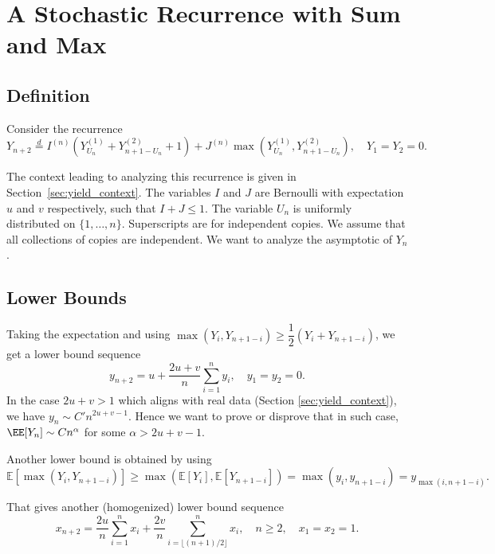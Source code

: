 \chapter{A Stochastic Recurrence with Sum and Max}

\section{Definition}

Consider the recurrence
\begin{equation}
  \label{eq:yield_indicator}
  Y_{n+2} \stackrel{d}{=} I^{(n)}\left(Y_{U_n}^{(1)} + Y_{n+1-U_n}^{(2)} + 1\right) + J^{(n)}\max\left(Y_{U_n}^{(1)}, Y_{n+1-U_n}^{(2)}\right), \quad Y_1 = Y_2 = 0.
\end{equation}

The context leading to analyzing this recurrence is given in Section~\ref{sec:yield_context}. The variables $I$ and $J$ are Bernoulli with expectation $u$ and $v$ respectively, such that $I + J \le 1$. The variable $U_n$ is uniformly distributed on $\{1, \ldots, n\}$. Superscripts are for independent copies. We assume that all collections of copies are independent. We want to analyze the asymptotic of $Y_n$.

\section{Lower Bounds}
Taking the expectation and using $\max(Y_i, Y_{n+1-i}) \ge \dfrac{1}{2}(Y_i + Y_{n+1-i})$, we get a lower bound sequence
\begin{equation}
  \label{eq:lower_bound_average}
  y_{n+2} = u + \dfrac{2u+v}{n}\sum_{i=1}^{n}y_i, \quad y_1=y_2=0.
\end{equation}
In the case $2u+v > 1$ which aligns with real data (Section \ref{sec:yield_context}), we have $y_n \sim C'n^{2u+v-1}$. Hence we want to prove or disprove that in such case, $\EE[Y_n]\sim Cn^\alpha$ for some $\alpha > 2u+v-1$.

Another lower bound is obtained by using
$$\mathbb{E}[\max(Y_i, Y_{n+1-i})] \ge \max(\mathbb{E}[Y_i], \mathbb{E}[Y_{n+1-i}]) = \max(y_i, y_{n+1-i}) = y_{\max(i, n+1-i)}.$$

That gives another (homogenized) lower bound sequence
\begin{equation}
  \label{eq:recurrence-sum-half-sum-corrected}
  x_{n+2} = \dfrac{2u}{n}\sum_{i=1}^{n}x_i + \dfrac{2v}{n}\sum_{i=\lfloor (n+1)/2 \rfloor}^{n}x_{i}, \quad n \ge 2, \quad  x_1=x_2=1.
\end{equation}

